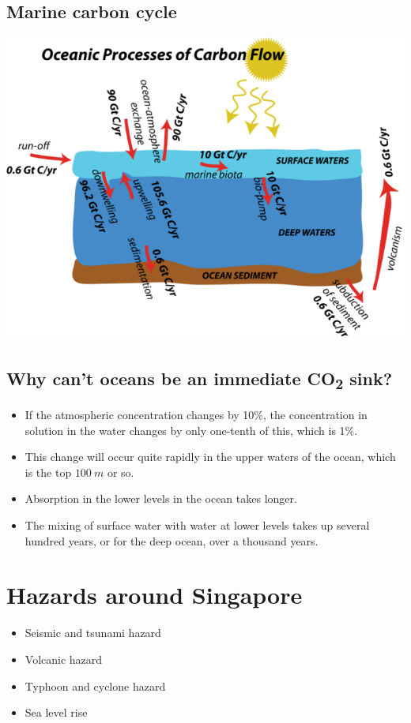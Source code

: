 \documentclass[11pt]{article}
\begin{document}
\subsection{Marine carbon cycle}
\label{sec:org049b3e4}
\begin{center}
\includegraphics[width=.9\linewidth]{./images/marine-carbon-cycle.png}
\end{center}

\subsection{Why can't oceans be an immediate CO\textsubscript{2} sink?}
\label{sec:org444b80f}
\begin{itemize}
\item If the atmospheric concentration changes by 10\%, the concentration in solution in the water changes by only one-tenth of this, which is 1\%.
\item This change will occur quite rapidly in the upper waters of the ocean, which is the top \(\qty{100}{m}\) or so.
\item Absorption in the lower levels in the ocean takes longer.
\item The mixing of surface water with water at lower levels takes up several hundred years, or for the deep ocean, over a thousand years.
\end{itemize}


\section{Hazards around Singapore}
\label{sec:org74c90dc}
\begin{itemize}
\item Seismic and tsunami hazard
\item Volcanic hazard
\item Typhoon and cyclone hazard
\item Sea level rise
\end{itemize}
\end{document}
